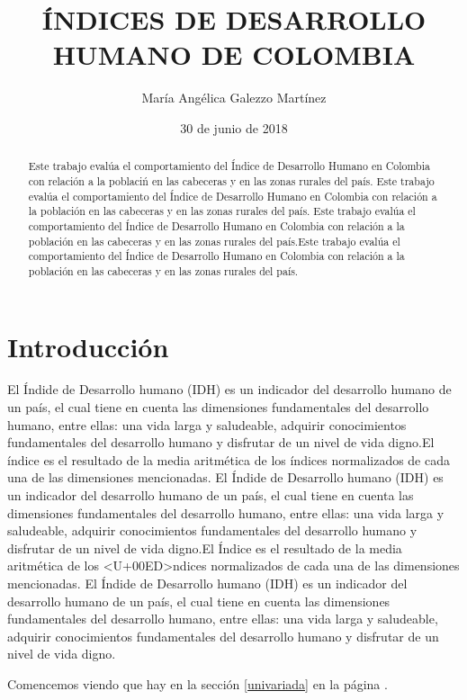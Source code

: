 \documentclass{article}
\title{\'INDICES DE DESARROLLO HUMANO DE COLOMBIA}
\author[1]{\normalsize Mar\'ia Ang\'elica Galezzo Mart\'inez}
\affil[1]{\small  Escuela de Ingenier\'ia,Universidad de los Andes,\\

\texttt{{ma.galezzo}@uniandes.edu.co}}
\date{30 de junio de 2018}
\begin{document}


\maketitle

\begin{abstract}
Este trabajo eval\'ua el comportamiento del \'Indice de Desarrollo Humano en Colombia con relaci\'on a la poblaci\'n en las cabeceras y en las zonas rurales del pa\'is. Este trabajo eval\'ua el comportamiento del \'Indice de Desarrollo Humano en Colombia con relaci\'on a la poblaci\'on en las cabeceras y en las zonas rurales del pa\'is. Este trabajo eval\'ua el comportamiento del \'Indice de Desarrollo Humano en Colombia con relaci\'on a la poblaci\'on en las cabeceras y en las zonas rurales del pa\'is.Este trabajo eval\'ua el comportamiento del \'Indice de Desarrollo Humano en Colombia con relaci\'on a la poblaci\'on en las cabeceras y en las zonas rurales del pa\'is.
\end{abstract}

\section*{Introducci\'on}

El \'Indide de Desarrollo humano (IDH) es un indicador del desarrollo humano de un pa\'is, el cual tiene en cuenta las dimensiones fundamentales del desarrollo humano, entre ellas: una vida larga y saludeable, adquirir conocimientos fundamentales del desarrollo humano y disfrutar de un nivel de vida digno.El \'indice es el resultado de la media aritm\'etica de los \'indices normalizados de cada una de las dimensiones mencionadas. El \'Indide de Desarrollo humano (IDH) es un indicador del desarrollo humano de un pa\'is, el cual tiene en cuenta las dimensiones fundamentales del desarrollo humano, entre ellas: una vida larga y saludeable, adquirir conocimientos fundamentales del desarrollo humano y disfrutar de un nivel de vida digno.El \'Indice es el resultado de la media aritm\'etica de los <U+00ED>ndices normalizados de cada una de las dimensiones mencionadas. El \'Indide de Desarrollo humano (IDH) es un indicador del desarrollo humano de un pa\'is, el cual tiene en cuenta las dimensiones fundamentales del desarrollo humano, entre ellas: una vida larga y saludeable, adquirir conocimientos fundamentales del desarrollo humano y disfrutar de un nivel de vida digno. 

Comencemos viendo que hay en la secci\'on \ref{univariada} en la p\'agina \pageref{univariada}.
\end{document}
